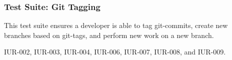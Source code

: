 \subsubsection{Test Suite: Git Tagging}
\begin{description}[align=right,leftmargin=3.2cm,labelindent=3.0cm]
\item[Purpose:] This test suite ensures a developer is able to tag git-commits, create new branches based on git-tags, and perform new work on a new branch.
\item[Requirement:] IUR-002, IUR-003, IUR-004, IUR-006, IUR-007, IUR-008, and IUR-009.
\end{description}
